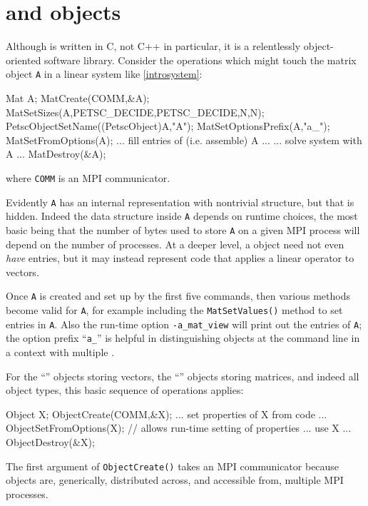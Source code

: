 \section{\PETSc \pVec and \pMat objects}

Although \PETSc is written in C, not C++ in particular, it is a relentlessly object-oriented software library.  Consider the operations which might touch the matrix object \texttt{A} in a linear system like \eqref{introsystem}:
\begin{code}
  Mat A;
  MatCreate(COMM,&A);
  MatSetSizes(A,PETSC_DECIDE,PETSC_DECIDE,N,N);
  PetscObjectSetName((PetscObject)A,"A");
  MatSetOptionsPrefix(A,"a_");
  MatSetFromOptions(A);
  ... fill entries of (i.e. assemble) A ...
  ... solve system with A ...
  MatDestroy(&A);
\end{code}
where \texttt{COMM} is an MPI communicator.

Evidently \texttt{A} has an internal representation with nontrivial structure, but that is hidden.  Indeed the data structure inside \texttt{A} depends on runtime choices, the most basic being that the number of bytes used to store \texttt{A} on a given MPI process will depend on the number of processes.  At a deeper level, a \PETSc \pMat object need not even \emph{have} entries, but it may instead represent code that applies a linear operator to vectors.

Once \texttt{A} is created and set up by the first five commands, then various methods become valid for \texttt{A}, for example including the \texttt{MatSetValues()} method to set entries in \texttt{A}.  Also the run-time option \texttt{-a\_mat\_view} will print out the entries of \texttt{A}; the option prefix ``\texttt{a\_}'' is helpful in distinguishing \pMat objects at the command line in a context with multiple \pMats.

For the ``\pVec'' objects storing vectors, the ``\pMat'' objects storing matrices, and indeed all \PETSc object types, this basic sequence of operations applies:
\begin{code}
  Object X;
  ObjectCreate(COMM,&X);
  ... set properties of X from code ...
  ObjectSetFromOptions(X);  // allows run-time setting of properties
  ... use X ...
  ObjectDestroy(&X);
\end{code}
The first argument of \texttt{ObjectCreate()} takes an MPI communicator because \PETSc objects are, generically, distributed across, and accessible from, multiple MPI processes. 

